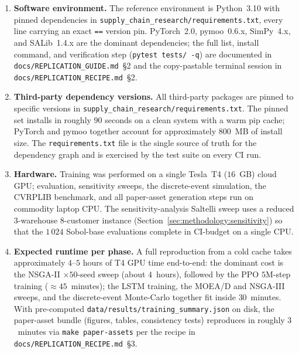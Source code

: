 \documentclass[review,preprint,authoryear,12pt]{elsarticle}
\begin{document}
\begin{enumerate}
\item \textbf{Software environment.} The reference environment is
Python~3.10 with pinned dependencies in
\texttt{supply\_chain\_research/requirements.txt}, every line
carrying an exact \texttt{==} version pin. PyTorch~2.0,
pymoo~0.6.x, SimPy~4.x, and SALib~1.4.x are the dominant
dependencies; the full list, install command, and verification step
(\texttt{pytest tests/ -q}) are documented in
\texttt{docs/REPLICATION\_GUIDE.md}~\S2 and the copy-pastable
terminal session in \texttt{docs/REPLICATION\_RECIPE.md}~\S2.

\item \textbf{Third-party dependency versions.} All third-party
packages are pinned to specific versions in
\texttt{supply\_chain\_research/requirements.txt}. The pinned set
installs in roughly $90$ seconds on a clean system with a warm pip
cache; PyTorch and pymoo together account for approximately
$800$~MB of install size. The \texttt{requirements.txt} file is the
single source of truth for the dependency graph and is exercised by
the test suite on every CI run.

\item \textbf{Hardware.} Training was performed on a single
Tesla~T4 ($16$~GB) cloud GPU; evaluation, sensitivity sweeps, the
discrete-event simulation, the CVRPLIB benchmark, and all
paper-asset generation steps run on commodity laptop CPU. The
sensitivity-analysis Saltelli sweep uses a reduced
$3$-warehouse $8$-customer instance
(Section~\ref{sec:methodology:sensitivity}) so that the $1\,024$
Sobol-base evaluations complete in CI-budget on a single CPU.

\item \textbf{Expected runtime per phase.} A full reproduction from
a cold cache takes approximately $4$--$5$ hours of T4 GPU time
end-to-end: the dominant cost is the NSGA-II
$\times 50$-seed sweep (about $4$~hours), followed by the PPO
$5$M-step training ($\approx 45$~minutes); the LSTM training, the
MOEA/D and NSGA-III sweeps, and the discrete-event Monte-Carlo
together fit inside $30$~minutes. With pre-computed
\texttt{data/results/training\_summary.json} on disk, the
paper-asset bundle (figures, tables, consistency tests) reproduces
in roughly $3$~minutes via \texttt{make paper-assets} per the
recipe in \texttt{docs/REPLICATION\_RECIPE.md}~\S3.


\end{enumerate}
\end{document}
